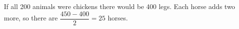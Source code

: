 If all 200 animals were chickens there would be 400 legs. Each horse adds two more, so there are $\dfrac{450-400}{2}=\boxed{25}$ horses.
